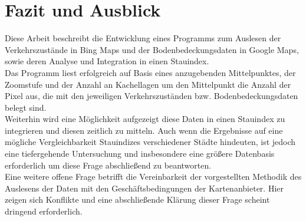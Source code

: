 \section{Fazit und Ausblick}
Diese Arbeit beschreibt die Entwicklung eines Programms zum Auslesen der Verkehrszustände in Bing Maps und der Bodenbedeckungsdaten in Google Maps, sowie deren Analyse und Integration in einen Stauindex.\\ Das Programm liest erfolgreich auf Basis eines anzugebenden Mittelpunktes, der Zoomstufe und der Anzahl an Kachellagen um den Mittelpunkt die Anzahl der Pixel aus, die mit den jeweiligen Verkehrszuständen bzw. Bodenbedeckungsdaten belegt sind.\\ Weiterhin wird eine Möglichkeit aufgezeigt diese Daten in einen Stauindex zu integrieren und diesen zeitlich zu mitteln. Auch wenn die Ergebnisse auf eine mögliche Vergleichbarkeit Stauindizes verschiedener Städte hindeuten, ist jedoch eine tiefergehende Untersuchung und insbesondere eine größere Datenbasis erforderlich um diese Frage abschließend zu beantworten.\\ Eine weitere offene Frage betrifft die Vereinbarkeit der vorgestellten Methodik des Auslesens der Daten mit den Geschäftsbedingungen der Kartenanbieter. Hier zeigen sich Konflikte und eine abschließende Klärung dieser Frage scheint dringend erforderlich.  